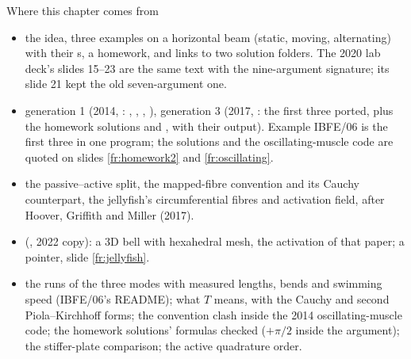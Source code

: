 \documentclass[aspectratio=169,11pt]{beamer}
\begin{document}
\begin{frame}{Where this chapter comes from}
\label{fr:sources}
\scriptsize
\begin{itemize}
  \item {} the idea, three examples on a horizontal beam (static, moving, alternating) with their s, a homework, and links to two solution folders. The 2020 lab deck's slides 15--23 are the same text with the nine-argument signature; its slide 21 kept the old seven-argument one.
  \item {} generation 1 (2014, : , , , ), generation 3 (2017, : the first three ported, plus the homework solutions  and , with their output). Example IBFE/06 is the first three in one program; the solutions and the oscillating-muscle code are quoted on slides \ref{fr:homework2} and \ref{fr:oscillating}.
  \item {} the passive--active split, the mapped-fibre convention and its Cauchy counterpart, the jellyfish's circumferential fibres and activation field, after Hoover, Griffith and Miller (2017).
  \item {} (, 2022 copy): a 3D bell with hexahedral mesh, the activation of that paper; a pointer, slide \ref{fr:jellyfish}.
  \item {} the runs of the three modes with measured lengths, bends and swimming speed (IBFE/06's README); what $T$ means, with the Cauchy and second Piola--Kirchhoff forms; the convention clash inside the 2014 oscillating-muscle code; the homework solutions' formulas checked ($+\pi/2$ inside the argument); the stiffer-plate comparison; the active quadrature order.
\end{itemize}
\end{frame}
\end{document}
